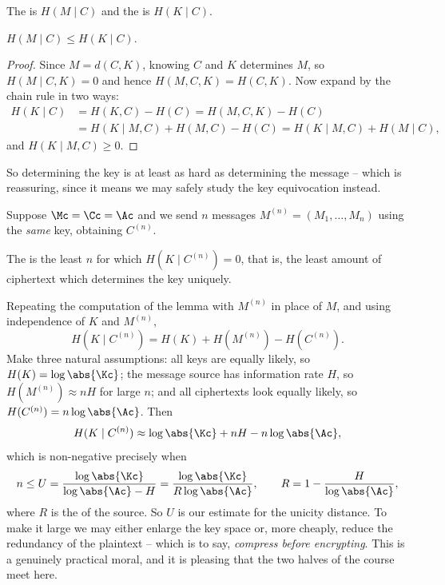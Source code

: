 \begin{definition}
	The  is $H(M\mid C)$ and the  is $H(K\mid C)$.
\end{definition}

\begin{lemma}
	$H(M\mid C)\le H(K\mid C)$.
\end{lemma}

\begin{proof}
	Since $M = d(C,K)$, knowing $C$ and $K$ determines $M$, so $H(M\mid C,K) = 0$ and hence $H(M,C,K) = H(C,K)$. Now expand by the chain rule in two ways:
	\begin{align*}
		H(K\mid C) &= H(K,C)-H(C) = H(M,C,K)-H(C)\\
		&= H(K\mid M,C) + H(M,C) - H(C) = H(K\mid M,C)+H(M\mid C),
	\end{align*}
	and $H(K\mid M,C)\ge0$.
\end{proof}

So determining the key is at least as hard as determining the message -- which is reassuring, since it means we may safely study the key equivocation instead.

Suppose $\Mc = \Cc = \Ac$ and we send $n$ messages $M^{(n)} = (M_1,\dots,M_n)$ using the \emph{same} key, obtaining $C^{(n)}$.

\begin{definition}
	The  is the least $n$ for which $H(K\mid C^{(n)}) = 0$, that is, the least amount of ciphertext which determines the key uniquely.
\end{definition}

Repeating the computation of the lemma with $M^{(n)}$ in place of $M$, and using independence of $K$ and $M^{(n)}$,
$$H(K\mid C^{(n)}) = H(K)+H(M^{(n)})-H(C^{(n)}).$$
Make three natural assumptions: all keys are equally likely, so $H(K) = \log\abs{\Kc}$; the message source has information rate $H$, so $H(M^{(n)})\approx nH$ for large $n$; and all ciphertexts look equally likely, so $H(C^{(n)}) = n\log\abs{\Ac}$. Then
$$H(K\mid C^{(n)}) \approx \log\abs{\Kc} + nH - n\log\abs{\Ac},$$
which is non-negative precisely when
$$n \le U = \frac{\log\abs{\Kc}}{\log\abs{\Ac}-H} = \frac{\log\abs{\Kc}}{R\log\abs{\Ac}}, \qquad R = 1 - \frac{H}{\log\abs{\Ac}},$$
where $R$ is the  of the source. So $U$ is our estimate for the unicity distance. To make it large we may either enlarge the key space or, more cheaply, reduce the redundancy of the plaintext -- which is to say, \emph{compress before encrypting}. This is a genuinely practical moral, and it is pleasing that the two halves of the course meet here.


